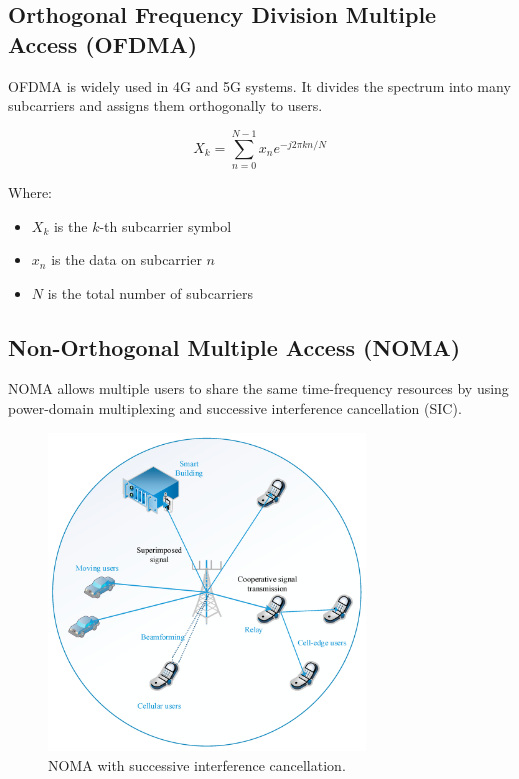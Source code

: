 \subsection{Orthogonal Frequency Division Multiple Access (OFDMA)}
OFDMA is widely used in 4G and 5G systems. It divides the spectrum into many subcarriers and assigns them orthogonally to users.

\begin{equation}
X_k = \sum_{n=0}^{N-1} x_n e^{-j2\pi kn/N}
\end{equation}

Where:
\begin{itemize}
  \item $X_k$ is the $k$-th subcarrier symbol
  \item $x_n$ is the data on subcarrier $n$
  \item $N$ is the total number of subcarriers
\end{itemize}

\subsection{Non-Orthogonal Multiple Access (NOMA)}
NOMA allows multiple users to share the same time-frequency resources by using power-domain multiplexing and successive interference cancellation (SIC).

\begin{figure}[H]
    \centering
    \includegraphics[width=0.75\textwidth]{images/noma_example.png}
    \caption{NOMA with successive interference cancellation.}
\end{figure}

